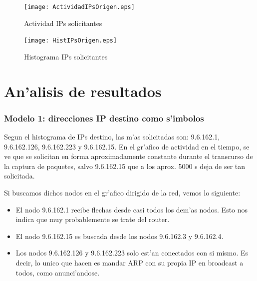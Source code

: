 \documentclass[a4paper,10pt]{article}
\begin{document}
\newpage

\begin{figure}[!hbp]
\begin{center}
\texttt{[image: ActividadIPsOrigen.eps]}
\end{center}
\caption{Actividad IPs solicitantes} \label{figura4}
\end{figure}

\begin{figure}[!hbp]
\begin{center}
\texttt{[image: HistIPsOrigen.eps]}
\end{center}
\caption{Histograma IPs solicitantes} \label{figura5}
\end{figure}

\newpage

\clearpage

\section{An'alisis de resultados}
\label{analisis1:}

\subsubsection{Modelo 1: direcciones IP destino como s'imbolos}

Segun el histograma de IPs destino, las m'as solicitadas son: 9.6.162.1, 9.6.162.126, 9.6.162.223 y 9.6.162.15. En el gr'afico de actividad en el tiempo, se ve que se solicitan en forma aproximadamente constante durante el transcurso de la captura de paquetes, salvo 9.6.162.15 que a los aprox. 5000 s deja de ser tan solicitada. 

Si buscamos dichos nodos en el gr'afico dirigido de la red, vemos lo siguiente: 

\begin{itemize}
	\item El nodo 9.6.162.1 recibe flechas desde casi todos los dem'as nodos. Esto nos indica que muy probablemente se trate del router.
	\item El nodo 9.6.162.15 es buscada desde los nodos 9.6.162.3 y 9.6.162.4.
	\item Los nodos 9.6.162.126 y 9.6.162.223 solo est'an conectados con si mismo. Es decir, lo unico que hacen es mandar ARP con su propia IP en broadcast a todos, como anunci'andose.
\end{itemize}
\end{document}
